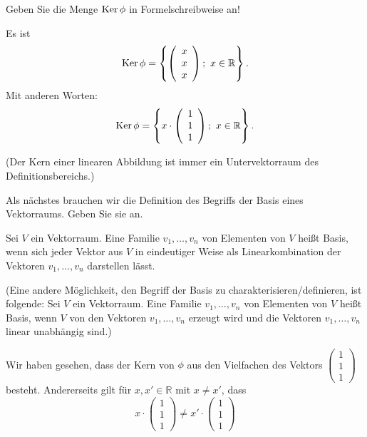 \documentclass{ximera}
\begin{document}
\begin{question}
Geben Sie die Menge $\mathop{\rm Ker}\phi$ in Formelschreibweise an!
\begin{solution}
    \begin{free-response}
        Es ist 
\[
\mathop{\rm Ker}\phi = \left\{  \left(
\begin{array}{c}
x \\ x \\ x    
\end{array}
\right)  ;\ x\in \mathbb R  \right\}.
\]
Mit anderen Worten:
\[
\mathop{\rm Ker}\phi = \left\{ x\cdot  \left(
\begin{array}{c}
1 \\ 1 \\ 1    
\end{array}
\right)  ;\ x\in \mathbb R  \right\}.
\]

(Der Kern einer linearen Abbildung ist immer ein Untervektorraum des Definitionsbereichs.)
    \end{free-response}
\end{solution}
\end{question}


\begin{question}
    Als nächstes brauchen wir die Definition des Begriffs der Basis eines Vektorraums. Geben Sie sie an.
\begin{solution}
    \begin{free-response}
Sei $V$ ein Vektorraum. Eine Familie $v_1, \dots, v_n$ von Elementen von $V$ heißt Basis, wenn sich jeder Vektor aus $V$ in eindeutiger Weise als Linearkombination der Vektoren $v_1, \dots, v_n$ darstellen lässt.

(Eine andere Möglichkeit, den Begriff der Basis zu charakterisieren/definieren, ist folgende:
Sei $V$ ein Vektorraum. Eine Familie $v_1, \dots, v_n$ von Elementen von $V$ heißt Basis, wenn $V$ von den Vektoren $v_1,\dots, v_n$ erzeugt wird und die Vektoren $v_1, \dots, v_n$ linear unabhängig sind.)
    \end{free-response}
\end{solution}

\end{question}


Wir haben gesehen, dass der Kern von $\phi$ aus den  Vielfachen des Vektors $\left( \begin{array}{c}
    1 \\ 1\\ 1
\end{array} \right)$ besteht. Andererseits gilt für $x, x'\in \mathbb R$ mit $x\ne x'$, dass
\[
x\cdot  \left(
\begin{array}{c}
1 \\ 1 \\ 1    
\end{array}
\right) \ne  x'\cdot  \left(
\begin{array}{c}
1 \\ 1 \\ 1    
\end{array}
\right) 
\]
\end{document}

